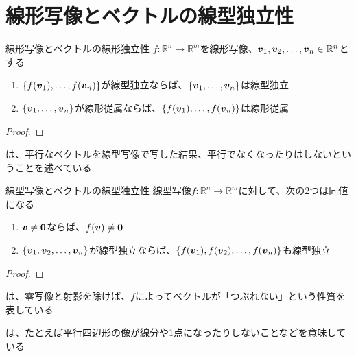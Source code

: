 \documentclass[../../../topic_linear-algebra]{subfiles}
\begin{document}
\sectionline
\section{線形写像とベクトルの線型独立性}

\begin{theorem}{線形写像とベクトルの線形独立性}
  $f\colon \mathbb{R}^n \to \mathbb{R}^m$を線形写像、$\vb*{v}_1, \vb*{v}_2, \dots, \vb*{v}_n \in \mathbb{R}^n$とする
  \begin{enumerate}[label=\romanlabel]
    \item $\{ f(\vb*{v}_1), \dots, f(\vb*{v}_n) \}$が線型独立ならば、$\{ \vb*{v}_1, \dots, \vb*{v}_n \}$は線型独立
    \item $\{\vb*{v}_1, \dots, \vb*{v}_n\}$が線形従属ならば、$\{ f(\vb*{v}_1),  \dots, f(\vb*{v}_n) \}$は線形従属
  \end{enumerate}
\end{theorem}

\begin{proof}
\end{proof}

は、平行なベクトルを線型写像で写した結果、平行でなくなったりはしないということを述べている

\sectionline

\begin{theorem}{線型写像とベクトルの線型独立性}
  線型写像$f\colon \mathbb{R}^n \to \mathbb{R}^m$に対して、次の2つは同値になる
  \begin{enumerate}[label=\romanlabel]
    \item $\vb*{v} \neq \vb*{0}$ならば、$f(\vb*{v}) \neq \vb*{0}$
    \item $\{ \vb*{v}_1, \vb*{v}_2, \dots, \vb*{v}_n \}$が線型独立ならば、$\{ f(\vb*{v}_1), f(\vb*{v}_2), \dots, f(\vb*{v}_n) \}$も線型独立
  \end{enumerate}
\end{theorem}

\begin{proof}
\end{proof}

は、零写像と射影を除けば、$f$によってベクトルが「つぶれない」という性質を表している


\br

は、たとえば平行四辺形の像が線分や1点になったりしないことなどを意味している
\end{document}
